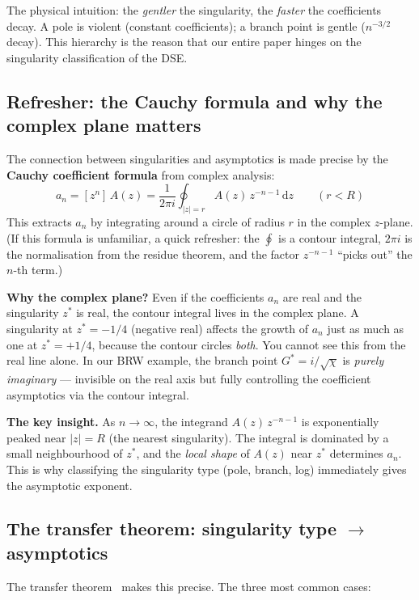 \documentclass[11pt,a4paper]{article}
\theoremstyle{definition}
\newcommand{\dd}{\mathrm{d}}
\begin{document}
The physical intuition: the \emph{gentler} the singularity, the
\emph{faster} the coefficients decay. A pole is violent (constant
coefficients); a branch point is gentle ($n^{-3/2}$ decay).
This hierarchy is the reason that our entire paper hinges on the
singularity classification of the DSE.

\subsection{Refresher: the Cauchy formula and why the complex plane matters}

The connection between singularities and asymptotics is made precise by
the \textbf{Cauchy coefficient formula} from complex analysis:
\[
a_n = [z^n]\,A(z) = \frac{1}{2\pi i} \oint_{|z|=r} A(z)\, z^{-n-1}\, \dd z
\qquad (r < R)
\]
This extracts $a_n$ by integrating around a circle of radius $r$ in the
complex $z$-plane. (If this formula is unfamiliar, a quick refresher:
the $\oint$ is a contour integral, $2\pi i$ is the normalisation from
the residue theorem, and the factor $z^{-n-1}$ ``picks out'' the $n$-th
term.)

\textbf{Why the complex plane?} Even if the coefficients $a_n$ are real
and the singularity $z^*$ is real, the contour integral lives in the
complex plane. A singularity at $z^* = -1/4$ (negative real) affects
the growth of $a_n$ just as much as one at $z^* = +1/4$, because the
contour circles \emph{both}. You cannot see this from the real line alone.
In our BRW example, the branch point $G^* = i/\sqrt{\chi}$ is
\emph{purely imaginary} --- invisible on the real axis but fully
controlling the coefficient asymptotics via the contour integral.

\textbf{The key insight.} As $n \to \infty$, the integrand
$A(z)\, z^{-n-1}$ is exponentially peaked near $|z| = R$ (the nearest
singularity). The integral is dominated by a small neighbourhood of
$z^*$, and the \emph{local shape} of $A(z)$ near $z^*$ determines
$a_n$. This is why classifying the singularity type (pole, branch, log)
immediately gives the asymptotic exponent.

\subsection{The transfer theorem: singularity type $\to$ asymptotics}

The transfer theorem~\cite{flajolet2009} makes this precise.
The three most common cases:
\end{document}
